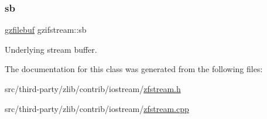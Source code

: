 \subsubsection{\texorpdfstring{sb}{sb}}
{\footnotesize\ttfamily \mbox{\hyperlink{classgzfilebuf}{gzfilebuf}} gzifstream\+::sb\hspace{0.3cm}{\ttfamily [private]}}

Underlying stream buffer. 

The documentation for this class was generated from the following files\+:\begin{DoxyCompactItemize}
\item 
src/third-\/party/zlib/contrib/iostream/\mbox{\hyperlink{zfstream_8h}{zfstream.\+h}}\item 
src/third-\/party/zlib/contrib/iostream/\mbox{\hyperlink{zfstream_8cpp}{zfstream.\+cpp}}\end{DoxyCompactItemize}

